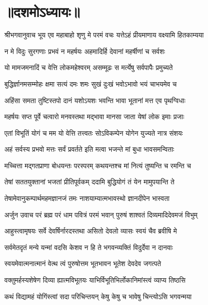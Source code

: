 \section{॥दशमोऽध्यायः॥}
{श्रीभगवानुवाच}
\twolineshloka
{भूय एव महाबाहो शृणु मे परमं वचः}
{यत्तेऽहं प्रीयमाणाय वक्ष्यामि हितकाम्यया}%

\twolineshloka
{न मे विदुः सुरगणाः प्रभवं न महर्षयः}
{अहमादिर्हि देवानां महर्षीणां च सर्वशः}%

\twolineshloka
{यो मामजमनादिं च वेत्ति लोकमहेश्वरम्}
{असम्मूढः स मर्त्येषु सर्वपापैः प्रमुच्यते}%

\twolineshloka
{बुद्धिर्ज्ञानमसम्मोहः क्षमा सत्यं दमः शमः}
{सुखं दुःखं भवोऽभावो भयं चाभयमेव च}%

\twolineshloka
{अहिंसा समता तुष्टिस्तपो दानं यशोऽयशः}
{भवन्ति भावा भूतानां मत्त एव पृथग्विधाः}%

\twolineshloka
{महर्षयः सप्त पूर्वे चत्वारो मनवस्तथा}
{मद्भावा मानसा जाता येषां लोक इमाः प्रजाः}%

\twolineshloka
{एतां विभूतिं योगं च मम यो वेत्ति तत्त्वतः}
{सोऽविकम्पेन योगेन युज्यते नात्र संशयः}%

\twolineshloka
{अहं सर्वस्य प्रभवो मत्तः सर्वं प्रवर्तते}
{इति मत्वा भजन्ते मां बुधा भावसमन्विताः}%

\twolineshloka
{मच्चित्ता मद्गतप्राणा बोधयन्तः परस्परम्}
{कथयन्तश्च मां नित्यं तुष्यन्ति च रमन्ति च}%

\twolineshloka
{तेषां सततयुक्तानां भजतां प्रीतिपूर्वकम्}
{ददामि बुद्धियोगं तं येन मामुपयान्ति ते}%

\twolineshloka
{तेषामेवानुकम्पार्थमहमज्ञानजं तमः}
{नाशयाम्यात्मभावस्थो ज्ञानदीपेन भास्वता}%

{अर्जुन उवाच}
\twolineshloka
{परं ब्रह्म परं धाम पवित्रं परमं भवान्}
{पुरुषं शाश्वतं दिव्यमादिदेवमजं विभुम्}%

\twolineshloka
{आहुस्त्वामृषयः सर्वे देवर्षिर्नारदस्तथा}
{असितो देवलो व्यासः स्वयं चैव ब्रवीषि मे}%

\twolineshloka
{सर्वमेतदृतं मन्ये यन्मां वदसि केशव}
{न हि ते भगवन्व्यक्तिं विदुर्देवा न दानवाः}%

\twolineshloka
{स्वयमेवात्मनात्मानं वेत्थ त्वं पुरुषोत्तम}
{भूतभावन भूतेश देवदेव जगत्पते}%

\twolineshloka
{वक्तुमर्हस्यशेषेण दिव्या ह्यात्मविभूतयः}
{याभिर्विभूतिभिर्लोकानिमांस्त्वं व्याप्य तिष्ठसि}%

\twolineshloka
{कथं विद्यामहं योगिंस्त्वां सदा परिचिन्तयन्}
{केषु केषु च भावेषु चिन्त्योऽसि भगवन्मया}%

